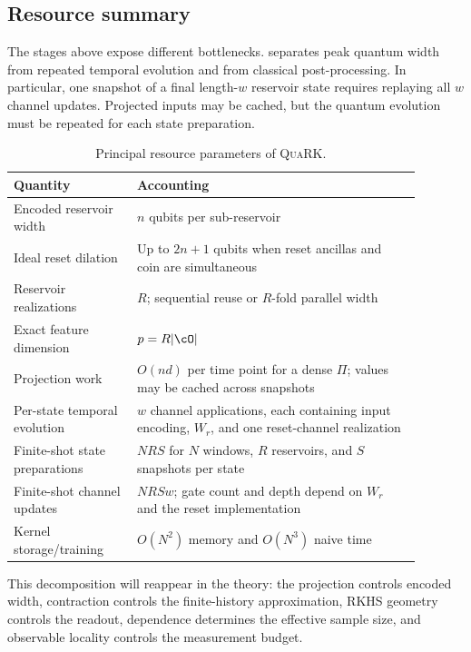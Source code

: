 \subsection{Resource summary}

The stages above expose different bottlenecks.  separates
peak quantum width from repeated temporal evolution and from classical
post-processing. In particular, one snapshot of a final length-\(w\) reservoir
state requires replaying all \(w\) channel updates. Projected inputs may be
cached, but the quantum evolution must be repeated for each state preparation.

\begin{table}[t]
\caption{Principal resource parameters of \textsc{QuaRK}.}
\label{tab:resources}
\centering
\begin{tabular}{p{0.27\linewidth}p{0.62\linewidth}}
\toprule
Quantity & Accounting \\
\midrule
Encoded reservoir width & \(n\) qubits per sub-reservoir \\
Ideal reset dilation & Up to \(2n+1\) qubits when reset ancillas and coin are simultaneous \\
Reservoir realizations & \(R\); sequential reuse or \(R\)-fold parallel width \\
Exact feature dimension & \(p=R|\cO|\) \\
Projection work & \(O(nd)\) per time point for a dense \(\Pi\); values may be cached across snapshots \\
Per-state temporal evolution & \(w\) channel applications, each containing input encoding, \(W_r\), and one reset-channel realization \\
Finite-shot state preparations & \(NRS\) for \(N\) windows, \(R\) reservoirs, and \(S\) snapshots per state \\
Finite-shot channel updates & \(NRS w\); gate count and depth depend on \(W_r\) and the reset implementation \\
Kernel storage/training & \(O(N^2)\) memory and \(O(N^3)\) naive time \\
\bottomrule
\end{tabular}
\end{table}

This decomposition will reappear in the theory: the projection controls encoded
width, contraction controls the finite-history approximation, RKHS geometry
controls the readout, dependence determines the effective sample size, and
observable locality controls the measurement budget.
